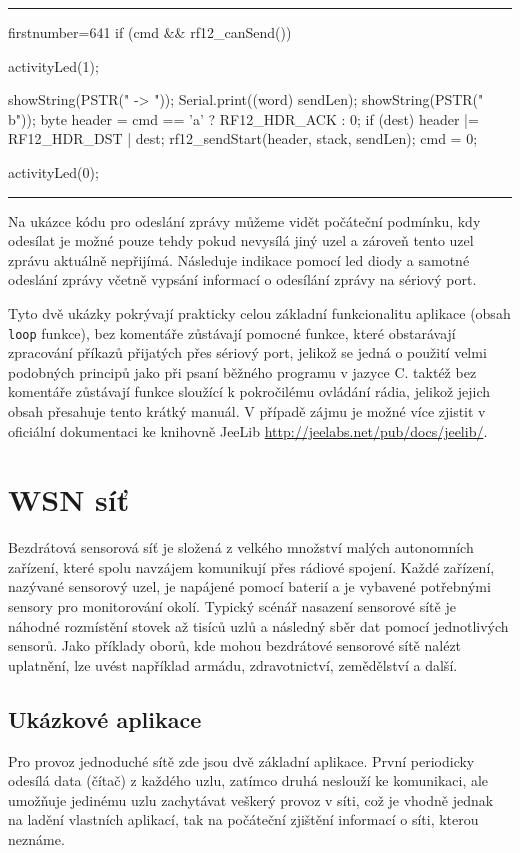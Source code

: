 \documentclass[12pt,titlepage]{article}
\newcommand{\codetitle}[1]{\bigskip \noindent {\scriptsize #1}\hrule}
\begin{document}
    
    
\newpage
\codetitle{Zjednodušená ukázka odeslání zprávy v RF12demo}
\begin{cppcode*}{firstnumber=641}  
if (cmd && rf12_canSend()) {
    activityLed(1);

    showString(PSTR(" -> "));
    Serial.print((word) sendLen);
    showString(PSTR(" b\n"));
    byte header = cmd == 'a' ? RF12_HDR_ACK : 0;
    if (dest)
        header |= RF12_HDR_DST | dest;
    rf12_sendStart(header, stack, sendLen);
    cmd = 0;

    activityLed(0);
}
\end{cppcode*}      
\hrule
\bigskip 
Na ukázce kódu pro odeslání zprávy můžeme vidět počáteční podmínku, kdy odesílat je možné pouze tehdy pokud nevysílá jiný uzel a zároveň tento uzel zprávu aktuálně nepřijímá. Následuje indikace pomocí led diody a samotné odeslání zprávy včetně vypsání informací o odesílání zprávy na sériový port. 

Tyto dvě ukázky pokrývají prakticky celou základní funkcionalitu aplikace (obsah \texttt{loop} funkce), bez komentáře zůstávají pomocné funkce, které obstarávají zpracování příkazů přijatých přes sériový port, jelikož se jedná o použití velmi podobných principů jako při psaní běžného programu v jazyce C. taktéž bez komentáře zůstávají funkce sloužící k pokročilému ovládání rádia, jelikož jejich obsah přesahuje tento krátký manuál. V případě zájmu je možné více zjistit v oficiální dokumentaci ke knihovně JeeLib \url{http://jeelabs.net/pub/docs/jeelib/}. 

\section{WSN síť}

	Bezdrátová sensorová síť je složená z velkého množství malých autonomních zařízení, které spolu navzájem komunikují přes rádiové spojení. Každé zařízení, nazývané sensorový uzel, je napájené pomocí 	baterií a je vybavené potřebnými sensory pro monitorování okolí. Typický scénář nasazení sensorové sítě je náhodné rozmístění stovek až tisíců uzlů a následný sběr dat pomocí jednotlivých sensorů. Jako příklady oborů, kde mohou bezdrátové sensorové sítě nalézt uplatnění, lze uvést například armádu, zdravotnictví, zemědělství a další.
	
	\subsection{Ukázkové aplikace}
	Pro provoz jednoduché sítě zde jsou dvě základní aplikace. První periodicky odesílá data (čítač) z každého uzlu, zatímco druhá neslouží ke komunikaci, ale umožňuje jedinému uzlu zachytávat veškerý provoz v síti, což je vhodně jednak na ladění vlastních aplikací, tak na počáteční zjištění informací o síti, kterou neznáme. 
\end{document}
